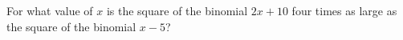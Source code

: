 For what value of $x$ is the square of the binomial $2x+10$ four times as large as the square of the binomial $x-5$?
